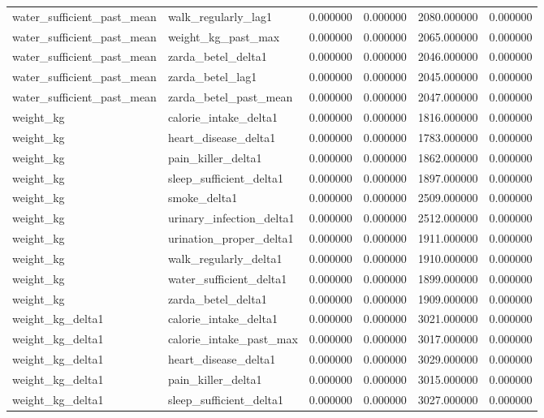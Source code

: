 \begin{longtable}{llrrrr}
water\_sufficient\_past\_mean & walk\_regularly\_lag1 & 0.000000 & 0.000000 & 2080.000000 & 0.000000 \\
water\_sufficient\_past\_mean & weight\_kg\_past\_max & 0.000000 & 0.000000 & 2065.000000 & 0.000000 \\
water\_sufficient\_past\_mean & zarda\_betel\_delta1 & 0.000000 & 0.000000 & 2046.000000 & 0.000000 \\
water\_sufficient\_past\_mean & zarda\_betel\_lag1 & 0.000000 & 0.000000 & 2045.000000 & 0.000000 \\
water\_sufficient\_past\_mean & zarda\_betel\_past\_mean & 0.000000 & 0.000000 & 2047.000000 & 0.000000 \\
weight\_kg & calorie\_intake\_delta1 & 0.000000 & 0.000000 & 1816.000000 & 0.000000 \\
weight\_kg & heart\_disease\_delta1 & 0.000000 & 0.000000 & 1783.000000 & 0.000000 \\
weight\_kg & pain\_killer\_delta1 & 0.000000 & 0.000000 & 1862.000000 & 0.000000 \\
weight\_kg & sleep\_sufficient\_delta1 & 0.000000 & 0.000000 & 1897.000000 & 0.000000 \\
weight\_kg & smoke\_delta1 & 0.000000 & 0.000000 & 2509.000000 & 0.000000 \\
weight\_kg & urinary\_infection\_delta1 & 0.000000 & 0.000000 & 2512.000000 & 0.000000 \\
weight\_kg & urination\_proper\_delta1 & 0.000000 & 0.000000 & 1911.000000 & 0.000000 \\
weight\_kg & walk\_regularly\_delta1 & 0.000000 & 0.000000 & 1910.000000 & 0.000000 \\
weight\_kg & water\_sufficient\_delta1 & 0.000000 & 0.000000 & 1899.000000 & 0.000000 \\
weight\_kg & zarda\_betel\_delta1 & 0.000000 & 0.000000 & 1909.000000 & 0.000000 \\
weight\_kg\_delta1 & calorie\_intake\_delta1 & 0.000000 & 0.000000 & 3021.000000 & 0.000000 \\
weight\_kg\_delta1 & calorie\_intake\_past\_max & 0.000000 & 0.000000 & 3017.000000 & 0.000000 \\
weight\_kg\_delta1 & heart\_disease\_delta1 & 0.000000 & 0.000000 & 3029.000000 & 0.000000 \\
weight\_kg\_delta1 & pain\_killer\_delta1 & 0.000000 & 0.000000 & 3015.000000 & 0.000000 \\
weight\_kg\_delta1 & sleep\_sufficient\_delta1 & 0.000000 & 0.000000 & 3027.000000 & 0.000000 \\

\end{longtable}
